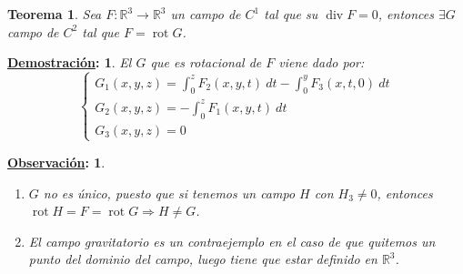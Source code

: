 \documentclass[10pt,a4paper,openright]{book}
\theoremstyle{break}
\newtheorem*{theo}{Teorema}
\newtheorem*{demo}{\underline{Demostración}:}
\newtheorem*{obs}{\underline{Observación}:}
\DeclareMathOperator{\rot}{rot}
\DeclareMathOperator{\divg}{div}
\newcommand{\dif}[1]{\ d#1}
\begin{document}
\begin{theo}
Sea $F: \mathbb{R}^3 \rightarrow \mathbb{R}^3$ un campo de $C^1$ tal que su $\divg F = 0$, entonces $\exists G$ campo de $C^2$ tal que $F = \rot G$.
\end{theo}
\begin{demo}
El $G$ que es rotacional de $F$ viene dado por:
$$\begin{cases}
G_1\left( x, y, z \right) = \displaystyle \int_{0}^{z} F_2\left( x, y, t \right) \dif{t} - \int_{0}^{y} F_3\left( x, t, 0 \right) \dif{t} \\  G_2\left( x, y, z \right) = \displaystyle  -\int_{0}^{z} F_1\left( x, y, t \right) \dif{t} \\ G_3\left( x, y, z \right) = 0
\end{cases}$$
\end{demo}
\begin{obs}
\begin{enumerate}
    \item $G$ no es único, puesto que si tenemos un campo $H$ con $H_3 \neq 0$, entonces $\rot H = F = \rot G \Rightarrow H \neq G$.
    \item El campo gravitatorio es un contraejemplo en el caso de que quitemos un punto del dominio del campo, luego tiene que estar definido en $\mathbb{R}^3$.
\end{enumerate}
\end{obs}
\end{document}
